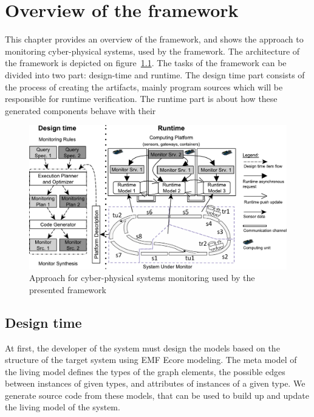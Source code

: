 
\chapter{Overview of the framework}


This chapter provides an overview of the framework, and shows the approach to monitoring cyber-physical systems, used by the framework.
The architecture of the framework is depicted on figure~\ref{fig:approach}. 
The tasks of the framework can be divided into two part: design-time and runtime.
The design time part consists of the process of creating the artifacts, mainly program sources which will be responsible for runtime verification.
The runtime part is about how these generated components behave with their 

\begin{figure}[h]
	\begin{center}
		\includegraphics[width=\textwidth]{figures/fase-overview-crop.pdf}
		\caption{Approach for cyber-physical systems monitoring used by the presented framework }
		\label{fig:approach}
	\end{center}
\end{figure}

\section{Design time}

At first, the developer of the system must design the models based on the structure of the target system using EMF Ecore modeling. 
The meta model of the living model defines the types of the graph elements, the possible edges between instances of given types, and attributes of instances of a given type. 
We generate \cpp{} source code from these models, that can be used to build up and update the living model of the system.

